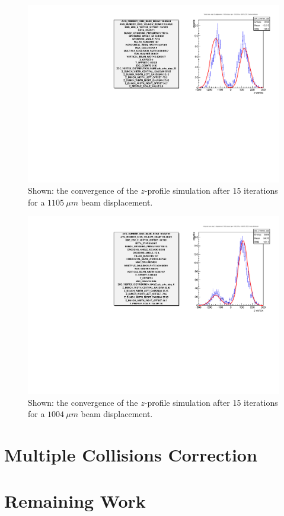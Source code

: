 \begin{figure}
  \centering
  \includegraphics[width=\textwidth]{./figures/1105_micron_step.pdf}
  \caption{
    Shown: the convergence of the $z$-profile simulation after 15 iterations for
    a $1105~\mu m$ beam displacement. 
  }
  \label{fig:profile_3}
\end{figure}

\begin{figure}
  \centering
  \includegraphics[width=\textwidth]{./figures/more_statistics.pdf}
  \caption{
    Shown: the convergence of the $z$-profile simulation after 15 iterations for
    a $1004~\mu m$ beam displacement. 
  }
  \label{fig:profile_4}
\end{figure}

\clearpage
\section{Multiple Collisions Correction}
\label{sec:multiple_collisions}

\clearpage
\section{Remaining Work}
\label{sec:remaining_work}
